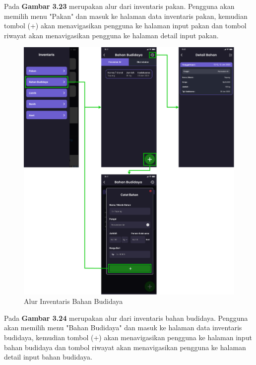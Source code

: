 \begin{enumerate}
\begin{enumerate}
		Pada \textbf{Gambar 3.23} merupakan alur dari inventaris pakan. Pengguna akan memilih menu "Pakan" dan masuk ke halaman data inventaris pakan, kemudian tombol (+) akan menavigasikan pengguna ke halaman input pakan dan tombol riwayat akan menavigasikan pengguna ke halaman detail input pakan.

		\begin{figure}[H]
			\centering
			\includegraphics[width=1\textwidth]{gambar/sprint2/flow_materials.png}
			\caption{Alur Inventaris Bahan Budidaya}
		\end{figure}

		Pada \textbf{Gambar 3.24} merupakan alur dari inventaris bahan budidaya. Pengguna akan memilih menu "Bahan Budidaya" dan masuk ke halaman data inventaris budidaya, kemudian tombol (+) akan menavigasikan pengguna ke halaman input bahan budidaya dan tombol riwayat akan menavigasikan pengguna ke halaman detail input bahan budidaya.


\end{enumerate}
\end{enumerate}
